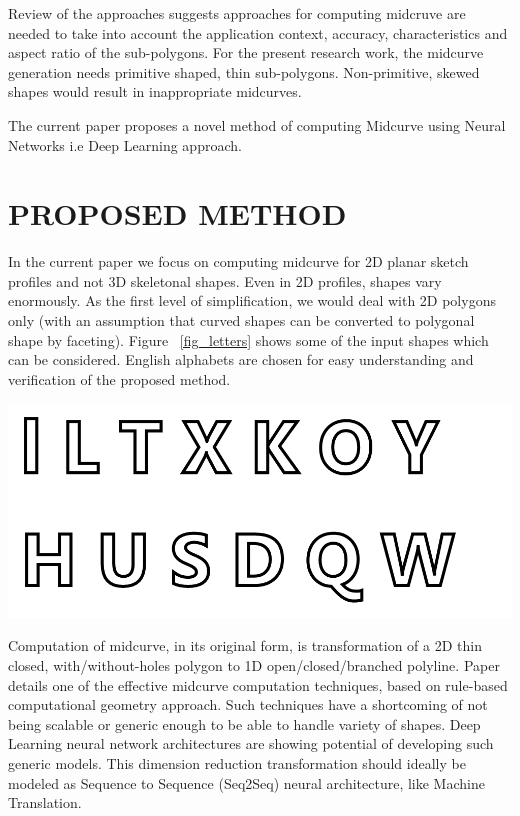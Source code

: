 \documentclass[9pt,academicons]{article}
\begin{document}
	
Review of the approaches suggests approaches for computing midcruve are needed to take into account the application context, accuracy, characteristics  and aspect ratio of the sub-polygons. For the present research work, the midcurve generation needs primitive shaped, thin sub-polygons. Non-primitive, skewed shapes would result in inappropriate midcurves.

 The current paper proposes a novel method of computing Midcurve using Neural Networks i.e Deep Learning approach.
 
 
\section{PROPOSED METHOD}
\label{sec:proposedmethod}

In the current paper we focus on computing midcurve for 2D planar sketch profiles and not 3D skeletonal shapes.  Even in 2D profiles, shapes vary enormously. As the first level of simplification, we would deal with 2D polygons only (with an assumption that curved shapes can be converted to polygonal shape by faceting). Figure ~\ref{fig_letters} shows some of the input shapes which can be considered. English alphabets are chosen for easy understanding and verification of the proposed method.

     \begin{center}
	\includegraphics[width=0.8\linewidth]{images/Letters}
	\label{fig_letters}
    \end{center}
		
		
Computation of midcurve, in its original form, is transformation of a 2D thin closed, with/without-holes polygon to 1D open/closed/branched polyline. Paper \cite{dimred2017} details one of the effective midcurve computation techniques, based on rule-based computational geometry approach. Such techniques have a shortcoming of not being scalable or generic enough to be able to handle variety of shapes. Deep Learning neural network architectures are showing potential of developing such generic models. This dimension reduction transformation should ideally be modeled as Sequence to Sequence (Seq2Seq) neural architecture, like Machine Translation. 
\end{document}
